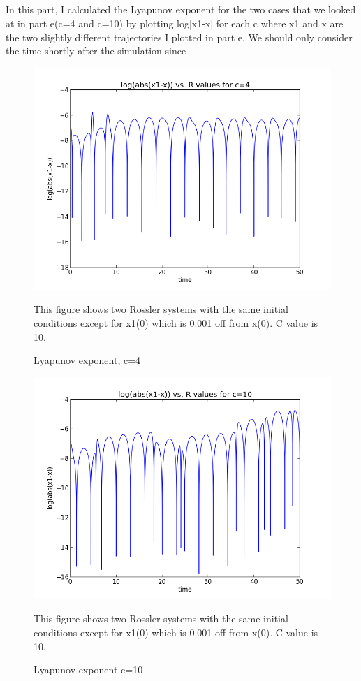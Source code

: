 \documentclass[letterpaper,12pt]{article}
\begin{document}
\subsection{}
In this part, I calculated the Lyapunov exponent for the two cases that we looked at in part e(c=4 and c=10) by plotting log|x1-x| for each c where x1 and x are the two slightly different trajectories I plotted in part e. We should only consider the time shortly after the simulation since 

\FloatBarrier
\begin{figure}[h!]
\centering
\includegraphics[scale=0.7]{1_f_4.png}
\caption{Lyapunov exponent, c=4}
This figure shows two Rossler systems with the same initial conditions except for x1(0) which is 0.001 off from x(0). C value is 10.
\end{figure}
\FloatBarrier

\FloatBarrier
\begin{figure}[h!]
\centering
\includegraphics[scale=0.7]{1_f_10.png}
\caption{Lyapunov exponent c=10}
This figure shows two Rossler systems with the same initial conditions except for x1(0) which is 0.001 off from x(0). C value is 10.
\end{figure}
\FloatBarrier
\end{document}
